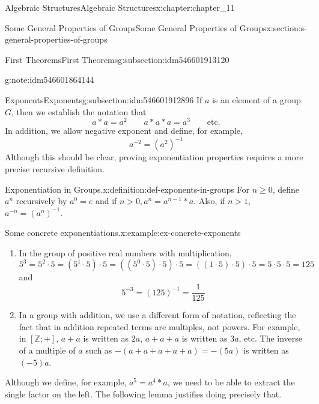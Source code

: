 \documentclass[oneside,10pt,]{book}
\numberwithin{equation}{section}
\begin{document}
\begin{chapterptx}{Algebraic Structures}{}{Algebraic Structures}{}{}{x:chapter:chapter_11}
\begin{sectionptx}{Some General Properties of Groups}{}{Some General Properties of Groups}{}{}{x:section:s-general-properties-of-groups}
\begin{subsectionptx}{First Theorems}{}{First Theorems}{}{}{g:subsection:idm546601913120}
\begin{note}{}{g:note:idm546601864144}
%
\end{note}
\end{subsectionptx}
%
%
\typeout{************************************************}
\typeout{************************************************}
%
\begin{subsectionptx}{Exponents}{}{Exponents}{}{}{g:subsection:idm546601912896}
If \(a\) is an element of a group \(G\), then we establish the notation that%
\begin{equation*}
a * a = a^2\quad \quad
a*a*a=a^3\quad \quad
\textrm{etc.}
\end{equation*}
In addition, we allow negative exponent and define, for example,%
\begin{equation*}
a^{-2}= \left(a^2\right)^{-1}
\end{equation*}
Although this should be clear, proving exponentiation properties requires a more precise recursive definition.%
\begin{definition}{Exponentiation in Groups.}{x:definition:def-exponents-in-groups}%
%
For \(n \geq  0\), define \(a^n\) recursively by \(a ^0 = e\) and if \(n > 0, a^n= a^{n-1} *a\). Also, if \(n >1\), \(a^{-n}= \left(a^n\right)^{-1}\).%
\end{definition}
\begin{example}{Some concrete exponentiations.}{x:example:ex-concrete-exponents}%
%
\begin{enumerate}[label=(\alph*)]
\item{}In the group of positive real numbers with multiplication,%
\begin{equation*}
5^3= 5^2\cdot 5 =\left(5^1\cdot 5\right)\cdot 5=\left(\left(5^0\cdot 5\right)\cdot 5\right)\cdot 5=((1\cdot 5)\cdot 5)\cdot 5=
5 \cdot 5\cdot 5=125
\end{equation*}
and%
\begin{equation*}
5^{-3}= (125)^{-1}= \frac{1}{125}
\end{equation*}
%
\item{}In a group with addition, we use a different form of notation, reflecting the fact that in addition repeated terms are multiples, not powers. For example, in \([\mathbb{Z}; +]\), \(a + a\) is written as \(2a\), \(a + a + a\) is written as \(3a\), etc. The inverse of a multiple of \(a\) such as \(- (a + a + a + a + a) = -(5a)\) is written as \((-5)a\).%
\end{enumerate}
%
\end{example}
Although we define, for example, \(a^5=a^4* a\), we need to be able to extract the single factor on the left.  The following lemma justifies doing precisely that.%

\end{subsectionptx}
\end{sectionptx}
\end{chapterptx}
\end{document}
